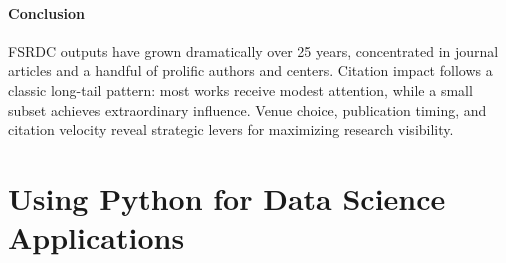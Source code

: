 \documentclass[12pt]{article}
\begin{document}
\paragraph*{Conclusion}
FSRDC outputs have grown dramatically over 25 years, concentrated in journal articles and a handful of prolific authors and centers. Citation impact follows a classic long-tail pattern: most works receive modest attention, while a small subset achieves extraordinary influence. Venue choice, publication timing, and citation velocity reveal strategic levers for maximizing research visibility.


\section{Using Python for Data Science Applications}
\end{document}
